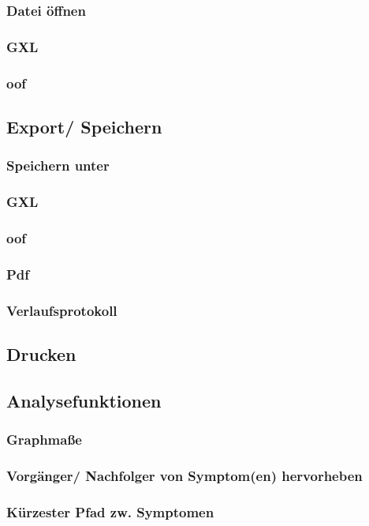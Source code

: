 \documentclass[enabledeprecatedfontcommands,fontsize=11pt,paper=a4,twoside]{scrartcl}
\newcounter{one}
\begin{document}
		\subsubsection{Datei öffnen}
		\subsubsection{GXL}
		\subsubsection{oof}
	\subsection{Export/ Speichern} \label{export}
		\subsubsection{Speichern unter}
		\subsubsection{GXL}
		\subsubsection{oof}
		\subsubsection{Pdf}
		\subsubsection{Verlaufsprotokoll}
	\subsection{Drucken} \label{print}
	\subsection{Analysefunktionen} \label{analyse}
		\subsubsection{Graphmaße} 
		\subsubsection{Vorgänger/ Nachfolger von Symptom(en) hervorheben}
		\subsubsection{Kürzester Pfad zw. Symptomen}
\end{document}
